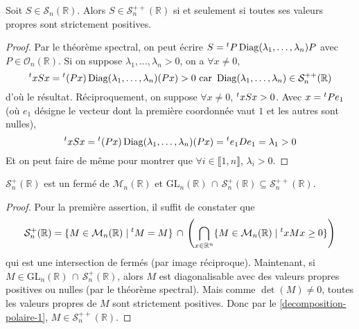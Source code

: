 





  \begin{lemma}
    \label{decomposition-polaire-1}
    Soit $S \in \mathcal{S}_n(\mathbb{R})$. Alors $S \in \mathcal{S}_n^{++}(\mathbb{R})$ si et seulement si toutes ses valeurs propres sont strictement positives.
  \end{lemma}

  \begin{proof}
    Par le théorème spectral, on peut écrire $S = \mathstrut ^t P \operatorname{Diag}(\lambda_1, \dots, \lambda_n) P$ avec $P \in \mathcal{O}_n(\mathbb{R})$. Si on suppose $\lambda_1, \dots, \lambda_n > 0$, on a $\forall x \neq 0$,
    \[ \mathstrut ^t x S x = \mathstrut ^t (Px) \operatorname{Diag}(\lambda_1, \dots, \lambda_n) (Px) > 0 \text{ car } \operatorname{Diag}(\lambda_1, \dots, \lambda_n) \in \mathcal{S}_n^{++}(\mathbb{R}) \]
    d'où le résultat.
    \newpar
    Réciproquement, on suppose $\forall x \neq 0$, $\mathstrut ^t x S x > 0$. Avec $x = \mathstrut ^t P e_1$ (où $e_1$ désigne le vecteur dont la première coordonnée vaut $1$ et les autres sont nulles),
    \[ \mathstrut ^t x S x = \mathstrut ^t (Px) \operatorname{Diag}(\lambda_1, \dots, \lambda_n) (Px) = \mathstrut ^t e_1 D e_1 = \lambda_1 > 0 \]
    Et on peut faire de même pour montrer que $\forall i \in \llbracket 1, n \rrbracket$, $\lambda_i > 0$.
  \end{proof}

  \begin{lemma}
    \label{decomposition-polaire-2}
    $\mathcal{S}_n^+(\mathbb{R})$ est un fermé de $\mathcal{M}_n(\mathbb{R})$ et $\mathrm{GL}_n(\mathbb{R}) \, \cap \, \mathcal{S}_n^{+}(\mathbb{R}) \subseteq \mathcal{S}_n^{++}(\mathbb{R})$.
  \end{lemma}

  \begin{proof}
    Pour la première assertion, il suffit de constater que
    \[ \mathcal{S}_n^+(\mathbb{R}) = \{ M \in \mathcal{M}_n(\mathbb{R}) \mid \mathstrut ^t M = M \} \, \cap \, \left( \bigcap_{x \in \mathbb{R}^n} \{ M \in \mathcal{M}_n(\mathbb{R}) \mid \mathstrut ^t x M x \geq 0 \} \right) \]
    qui est une intersection de fermés (par image réciproque). Maintenant, si $M \in \mathrm{GL}_n(\mathbb{R}) \, \cap \, \mathcal{S}_n^{+}(\mathbb{R})$, alors $M$ est diagonalisable avec des valeurs propres positives ou nulles (par le théorème spectral). Mais comme $\det(M) \neq 0$, toutes les valeurs propres de $M$ sont strictement positives. Donc par le \cref{decomposition-polaire-1}, $M \in \mathcal{S}_n^{++}(\mathbb{R})$.
  \end{proof}

